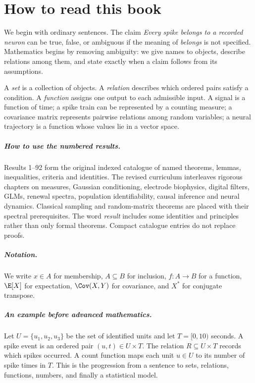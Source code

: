 \chapter*{How to read this book}
We begin with ordinary sentences. The claim \emph{Every spike belongs to a
recorded neuron} can be true, false, or ambiguous if the meaning of
\emph{belongs} is not specified. Mathematics begins by removing ambiguity:
we give names to objects, describe relations among them, and state
exactly when a claim follows from its assumptions.

A \emph{set} is a collection of objects. A \emph{relation} describes
which ordered pairs satisfy a condition. A \emph{function} assigns one output
to each admissible input. A signal is a function of time; a spike train can
be represented by a counting measure; a covariance matrix represents
pairwise relations among random variables; a neural trajectory is a
function whose values lie in a vector space.

\paragraph{How to use the numbered results.}
Results 1--92 form the original indexed catalogue of named theorems,
lemmas, inequalities, criteria and identities. The revised curriculum
interleaves rigorous chapters on measures, Gaussian conditioning,
electrode biophysics, digital filters, GLMs, renewal spectra, population
identifiability, causal inference and neural dynamics. Classical sampling
and random-matrix theorems are placed with their spectral prerequisites.
The word \emph{result} includes some identities and principles rather than
only formal theorems. Compact catalogue entries do not replace proofs.

\paragraph{Notation.} We write $x\in A$ for membership, $A\subseteq B$
for inclusion, $f:A\to B$ for a function, $\E[X]$ for expectation,
$\Cov(X,Y)$ for covariance, and $X^*$ for conjugate transpose.

\paragraph{An example before advanced mathematics.}
Let $U=\{u_1,u_2,u_3\}$ be the set of identified units and let
$T=[0,10)$ seconds. A spike event is an ordered pair
$(u,t)\in U\times T$. The relation $R\subseteq U\times T$
records which spikes occurred. A count function maps each unit
$u\in U$ to its number of spike times in $T$.
This is the progression from a sentence to sets, relations, functions,
numbers, and finally a statistical model.

